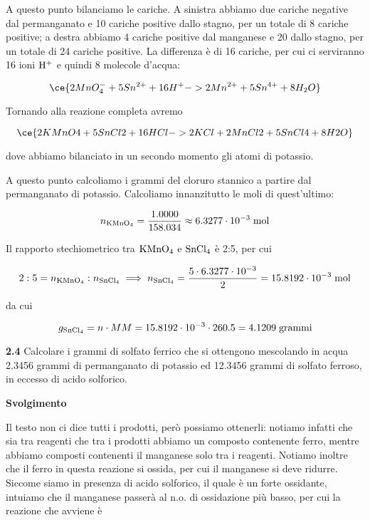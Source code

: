 A questo punto bilanciamo le cariche. A sinistra abbiamo due cariche negative dal permanganato e 10 cariche positive dallo stagno, per un totale di 8 cariche positive; a destra abbiamo 4 cariche positive dal manganese e 20 dallo stagno, per un totale di 24 cariche positive. La differenza è di 16 cariche, per cui ci serviranno 16 ioni $\rm H^+$ e quindi 8 molecole d'acqua: 

$$\ce{2MnO_4^- + 5Sn^{2+} + 16H^+ -> 2Mn^{2+} + 5Sn^{4+} + 8H_2O}$$

Tornando alla reazione completa avremo

$$\ce{2KMnO4 + 5SnCl2 + 16HCl -> 2KCl + 2MnCl2 + 5SnCl4 + 8H2O}$$

dove abbiamo bilanciato in un secondo momento gli atomi di potassio.

A questo punto calcoliamo i grammi del cloruro stannico a partire dal permanganato di potassio. Calcoliamo innanzitutto le moli di quest'ultimo:

$$n_{\rm KMnO_4}=\frac{1.0000}{158.034}
\approx 6.3277 \cdot 10^{-3} \; \rm mol$$

Il rapporto stechiometrico tra $\rm KMnO_4$ e $\rm SnCl_4$ è 2:5, per cui 

$$2:5=n_{\rm KMnO_4}:n_{\rm SnCl_4}
\implies
n_{\rm SnCl_4}=\frac{5 \cdot 6.3277 \cdot 10^{-3}}{2}
=15.8192 \cdot 10^{-3} \; \rm mol$$

da cui

$$g_{\rm SnCl_4}=n \cdot MM=15.8192 \cdot 10^{-3} \cdot 260.5=4.1209 \; \rm grammi$$

\vspace{0.2cm}\textbf{2.4} Calcolare i grammi di solfato ferrico che si ottengono mescolando in acqua 2.3456 grammi di permanganato di potassio  ed 12.3456 grammi di solfato ferroso, in eccesso di acido solforico.

\vspace{0.2cm}\large\textbf{Svolgimento}\normalsize

\vspace{0.2cm}Il testo non ci dice tutti i prodotti, però possiamo ottenerli: notiamo infatti che sia tra reagenti che tra i prodotti abbiamo un composto contenente ferro, mentre abbiamo composti contenenti il manganese solo tra i reagenti. Notiamo inoltre che il ferro in questa reazione si ossida, per cui il manganese si deve ridurre. Siccome siamo in presenza di acido solforico, il quale è un forte ossidante, intuiamo che il manganese passerà al n.o. di ossidazione più basso, per cui la reazione che avviene è

